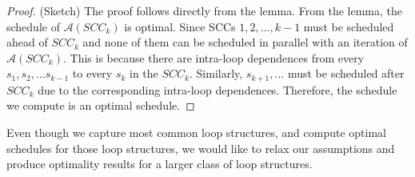 \begin{proof} (Sketch)
The proof follows directly from the lemma. From the lemma, the schedule of $\mathcal{A}(\mathit{SCC}_k)$ is optimal. Since SCCs $1, 2, ...,k-1$ must be scheduled ahead of $\mathit{SCC}_k$
and none of them can be scheduled in parallel with an iteration of $\mathcal{A}(\mathit{SCC}_k)$. This is because there are intra-loop dependences from every $s_1, s_2, ... s_{k-1}$ to every $s_k$ in the $\mathit{SCC}_k$. Similarly, $s_{k+1},...$ must be scheduled after $\mathit{SCC}_k$ due to the corresponding intra-loop dependences. Therefore, the schedule we compute is an optimal schedule. 
\end{proof}

Even though we capture most common loop structures, and compute optimal schedules for those loop structures, we would like to relax our assumptions and produce optimality results for a larger class of loop structures. 




